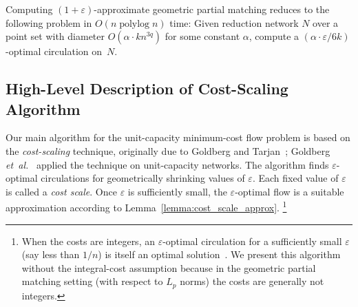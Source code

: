 \documentclass[a4paper,UKenglish]{socg-lipics-v2018}
\makeatletter
\def\etal{\emph{et~al.}}
\def\etal{\textit{et~al.}}
\def\polylog{\mathop{\mathrm{polylog}}}
\def\eps{\varepsilon}
\def\cost{\operatorname{cost}}
\theoremstyle{plain}
\numberwithin{figure}{section}
\def\EMPH#1{\textcolor{BrickRed}{{\emph{#1}}}}
\def\n@te#1{\textsf{\boldmath \textbf{$\langle\!\langle$#1$\rangle\!\rangle$}}\leavevmode}
\def\note#1{\textcolor{red}{\n@te{#1}}}
\renewcommand{\note}[1]{} %
\makeatother
\begin{document}
\begin{toappendix}
\note{UNRESOLVED ISSUE}


%
\end{toappendix}

\begin{lemma}
\label{lemma:cost_scale_approx} %
Computing $(1+\eps)$-approximate geometric partial matching reduces to the following problem in $O(n \polylog n)$ time:
Given reduction network $N$ over a point set with diameter $O(\alpha \cdot kn^{3q})$
for some constant $\alpha$, compute a $(\alpha \cdot \eps/6k)$-optimal circulation on~$N$.
\end{lemma}


\subsection{High-Level Description of Cost-Scaling Algorithm}
\label{SS:cost-scaling}

Our main algorithm for the unit-capacity minimum-cost flow problem is based on the \EMPH{cost-scaling} technique,
originally due to Goldberg and
Tarjan~\cite{GT90}; Goldberg \etal~\cite{GHKT17} applied the technique on unit-capacity networks.
%
The algorithm finds $\eps$-optimal circulations for geometrically shrinking
values of $\eps$.
Each fixed value of $\eps$ is called a
\EMPH{cost scale}.
Once $\eps$ is sufficiently small, the $\eps$-optimal flow is a suitable
approximation according to Lemma~\ref{lemma:cost_scale_approx}.%
\footnote{When the costs are integers, an $\eps$-optimal circulation for a sufficiently small $\eps$ (say less than $1/n$) is itself an optimal solution~\cite{GT90,GHKT17}.
We present this algorithm without the integral-cost assumption because in the geometric
partial matching setting (with respect to $L_p$ norms) the costs are generally not integers.}
\end{document}
